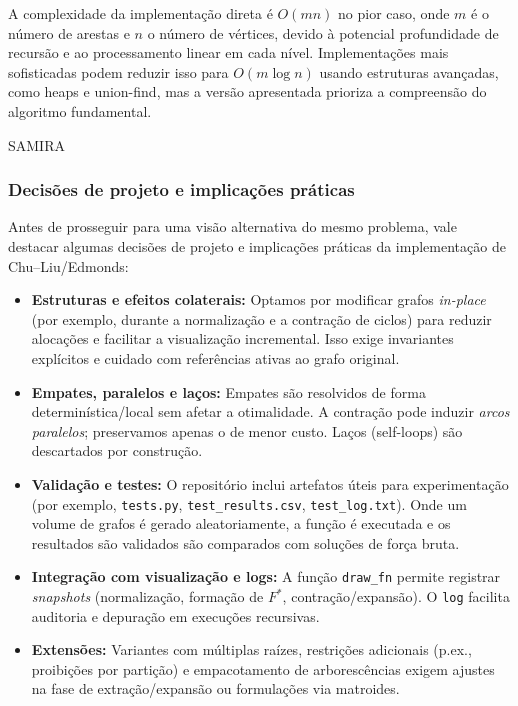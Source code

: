 A complexidade da implementação direta é \(O(mn)\) no pior caso, onde \(m\) é o número de arestas e \(n\) o número de vértices, devido à potencial profundidade de recursão e ao processamento linear em cada nível. Implementações mais sofisticadas podem reduzir isso para \(O(m \log n)\) usando estruturas avançadas, como heaps e union-find, mas a versão apresentada prioriza a compreensão do algoritmo fundamental.

SAMIRA
\subsubsection{Decisões de projeto e implicações práticas}

Antes de prosseguir para uma visão alternativa do mesmo problema, vale destacar algumas decisões de projeto e implicações práticas da implementação de Chu–Liu/Edmonds:
\begin{itemize}\setlength{\itemsep}{2pt}
    \item \textbf{Estruturas e efeitos colaterais:} Optamos por modificar grafos \emph{in-place} (por exemplo, durante a normalização e a contração de ciclos) para reduzir alocações e facilitar a visualização incremental. Isso exige invariantes explícitos e cuidado com referências ativas ao grafo original.
    \item \textbf{Empates, paralelos e laços:} Empates são resolvidos de forma determinística/local sem afetar a otimalidade. A contração pode induzir \emph{arcos paralelos}; preservamos apenas o de menor custo. Laços (self-loops) são descartados por construção.
    \item \textbf{Validação e testes:}  O repositório inclui artefatos úteis para experimentação (por exemplo, \texttt{tests.py}, \texttt{test\_results.csv}, \texttt{test\_log.txt}). Onde um volume de grafos é gerado aleatoriamente, a função é executada e os resultados são validados são comparados com soluções de força bruta.
    \item \textbf{Integração com visualização e logs:} A função \texttt{draw\_fn} permite registrar \emph{snapshots} (normalização, formação de \(F^*\), contração/expansão). O \texttt{log} facilita auditoria e depuração em execuções recursivas.
    \item \textbf{Extensões:} Variantes com múltiplas raízes, restrições adicionais (p.ex., proibições por partição) e empacotamento de arborescências exigem ajustes na fase de extração/expansão ou formulações via matroides.
\end{itemize}

